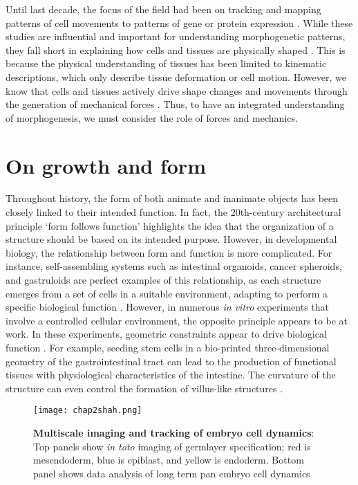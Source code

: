 Until last decade, the focus of the field had been on tracking and mapping patterns of cell movements to patterns of gene or protein expression \cite{gorfinkiel2021}. While these studies are influential and important for understanding morphogenetic patterns, they fall short in explaining how cells and tissues are physically shaped \cite{veenvliet2021, odell1981}. This is because the physical understanding of tissues has been limited to kinematic descriptions, which only describe tissue deformation or cell motion. However, we know that cells and tissues actively drive shape changes and movements through the generation of mechanical forces \cite{lecuit2011}. Thus, to have an integrated understanding of morphogenesis, we must consider the role of forces and mechanics.

\hypertarget{on-growth-and-form}{%
\section{On growth and form}\label{on-growth-and-form}}

Throughout history, the form of both animate and inanimate objects has been closely linked to their intended function. In fact, the 20th-century architectural principle `form follows function' highlights the idea that the organization of a structure should be based on its intended purpose. However, in developmental biology, the relationship between form and function is more complicated. For instance, self-assembling systems such as intestinal organoids, cancer spheroids, and gastruloids are perfect examples of this relationship, as each structure emerges from a set of cells in a suitable environment, adapting to perform a specific biological function \cite{gjorevski2016, ishiguro2017, morizane2017, vianello2019}. However, in numerous \textit{in vitro} experiments that involve a controlled cellular environment, the opposite principle appears to be at work. In these experiments, geometric constraints appear to drive biological function \cite{xi2018}. For example, seeding stem cells in a bio-printed three-dimensional geometry of the gastrointestinal tract can lead to the production of functional tissues with physiological characteristics of the intestine. The curvature of the structure can even control the formation of villus-like structures \cite{brassard2021}. 

\begin{figure}[h!]
	\centering
	\texttt{[image: chap2shah.png]}
	\caption{\label{fig_2_1} \textbf{Multiscale imaging and tracking of embryo cell dynamics}: Top panels show \textit{in toto} imaging of germlayer specification; red is mesendoderm, blue is epiblast, and yellow is endoderm. Bottom panel shows data analysis of long term pan embryo cell dynamics \cite{shah2019}}
\end{figure}

